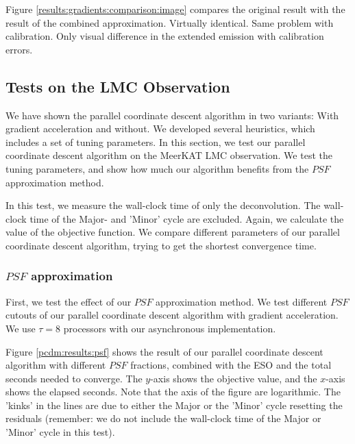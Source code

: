 Figure \ref{results:gradients:comparison:image} compares the original result with the result of the combined approximation. Virtually identical. Same problem with calibration. Only visual difference in the extended emission with calibration errors. 
































\subsection{Tests on the LMC Observation}\label{pcdm:results}
We have shown the parallel coordinate descent algorithm in two variants: With gradient acceleration and without. We developed several heuristics, which includes a set of tuning parameters. In this section, we test our parallel coordinate descent algorithm on the MeerKAT LMC observation. We test the tuning parameters, and show how much our algorithm benefits from the $PSF$ approximation method.

In this test, we measure the wall-clock time of only the deconvolution. The wall-clock time of the Major- and 'Minor' cycle are excluded. Again, we calculate the value of the objective function. We compare different parameters of our parallel coordinate descent algorithm, trying to get the shortest convergence time.

\subsubsection{$PSF$ approximation}
First, we test the effect of our $PSF$ approximation method. We test different $PSF$ cutouts of our parallel coordinate descent algorithm with gradient acceleration. We use $\tau = 8$ processors with our asynchronous implementation.

Figure \ref{pcdm:results:psf} shows the result of our parallel coordinate descent algorithm with different $PSF$ fractions, combined with the ESO and the total seconds needed to converge. The $y$-axis shows the objective value, and the $x$-axis shows the elapsed seconds. Note that the axis of the figure are logarithmic. The 'kinks' in the lines are due to either the Major or the 'Minor' cycle resetting the residuals (remember: we do not include the wall-clock time of the Major or 'Minor' cycle in this test).


